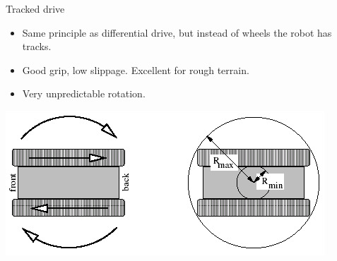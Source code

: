 \documentclass[compress]{beamer}
\begin{document}
\begin{frame}{Tracked drive}

\begin{itemize}
    \item Same principle as differential drive, but instead of wheels the robot
  has tracks.
    \item Good grip, low slippage. Excellent for rough terrain.
    \item Very unpredictable rotation.
\end{itemize}

    \begin{center}
        \includegraphics[width=0.8\linewidth]{tracked_drive}
    \end{center}
\end{frame}
\end{document}
